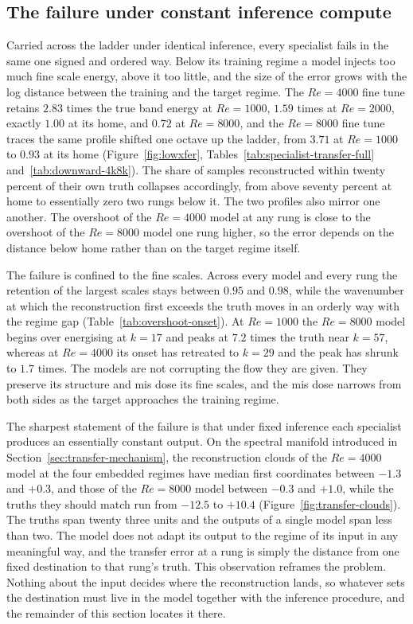 \subsection{The failure under constant inference compute}
\label{sec:transfer-failure}

Carried across the ladder under identical inference, every specialist fails in
the same one signed and ordered way. Below its training regime a model injects
too much fine scale energy, above it too little, and the size of the error
grows with the log distance between the training and the target regime. The
$Re=4000$ fine tune retains $2.83$ times the true band energy at $Re=1000$,
$1.59$ times at $Re=2000$, exactly $1.00$ at its home, and $0.72$ at
$Re=8000$, and the $Re=8000$ fine tune traces the same profile shifted one
octave up the ladder, from $3.71$ at $Re=1000$ to $0.93$ at its home
(Figure~\ref{fig:lowxfer}, Tables~\ref{tab:specialist-transfer-full}
and~\ref{tab:downward-4k8k}). The share of samples reconstructed within twenty
percent of their own truth collapses accordingly, from above seventy percent at
home to essentially zero two rungs below it. The two profiles also mirror one
another. The overshoot of the $Re=4000$ model at any rung is close to the
overshoot of the $Re=8000$ model one rung higher, so the error depends on the
distance below home rather than on the target regime itself.

The failure is confined to the fine scales. Across every model and every rung
the retention of the largest scales stays between $0.95$ and $0.98$, while the
wavenumber at which the reconstruction first exceeds the truth moves in an
orderly way with the regime gap (Table~\ref{tab:overshoot-onset}). At
$Re=1000$ the $Re=8000$ model begins over energising at $k=17$ and peaks at
$7.2$ times the truth near $k=57$, whereas at $Re=4000$ its onset has retreated
to $k=29$ and the peak has shrunk to $1.7$ times. The models are not corrupting
the flow they are given. They preserve its structure and mis dose its fine
scales, and the mis dose narrows from both sides as the target approaches the
training regime.

The sharpest statement of the failure is that under fixed inference each
specialist produces an essentially constant output. On the spectral manifold
introduced in Section~\ref{sec:transfer-mechanism}, the reconstruction clouds
of the $Re=4000$ model at the four embedded regimes have median first
coordinates between $-1.3$ and $+0.3$, and those of the $Re=8000$ model
between $-0.3$ and $+1.0$, while the truths they should match run from
$-12.5$ to $+10.4$ (Figure~\ref{fig:transfer-clouds}). The truths span twenty
three units and the outputs of a single model span less than two. The model
does not adapt its output to the regime of its input in any meaningful way, and
the transfer error at a rung is simply the distance from one fixed destination
to that rung's truth. This observation reframes the problem. Nothing about the
input decides where the reconstruction lands, so whatever sets the destination
must live in the model together with the inference procedure, and the
remainder of this section locates it there.

